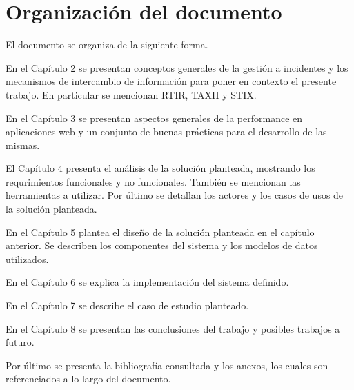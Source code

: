 \section{Organización del documento}
\label{capitulo1:organizacion}
El documento se organiza de la siguiente forma.

En el Capítulo 2 se presentan conceptos generales de la gestión a incidentes y los mecanismos de intercambio de información para poner en contexto el presente trabajo. En particular se mencionan RTIR, TAXII y STIX.

En el Capítulo 3 se presentan aspectos generales de la performance en aplicaciones web y un conjunto de buenas prácticas para el desarrollo de las mismas.

El Capítulo 4 presenta el análisis de la solución planteada, mostrando los requrimientos funcionales y no funcionales. También se mencionan las herramientas a utilizar. Por último se detallan los actores y los casos de usos de la solución planteada.

En el Capítulo 5 plantea el diseño de la solución planteada en el capítulo anterior. Se describen los componentes del sistema y los modelos de datos utilizados.

En el Capítulo 6 se explica la implementación del sistema definido.

En el Capítulo 7 se describe el caso de estudio planteado.

En el Capítulo 8 se presentan las conclusiones del trabajo y posibles trabajos a futuro.

Por último se presenta la bibliografía consultada y los anexos, los cuales son referenciados a lo largo del documento.
